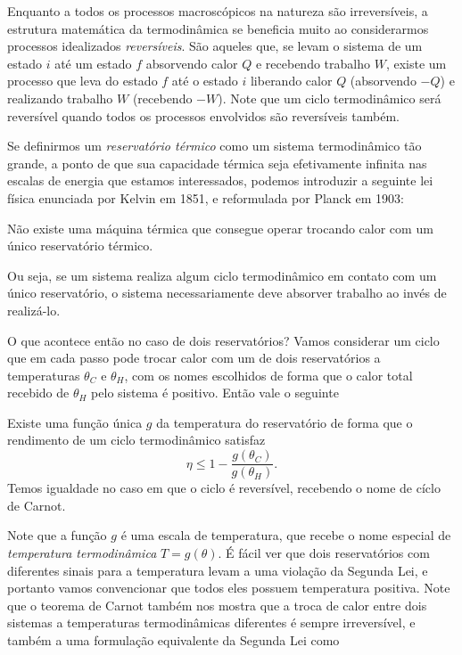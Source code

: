 Enquanto a todos os processos macroscópicos na natureza são irreversíveis, a
estrutura matemática da termodinâmica se beneficia muito ao considerarmos
processos idealizados \emph{reversíveis}. São aqueles que, se levam o sistema de
um estado $i$ até um estado $f$ absorvendo calor $Q$ e recebendo trabalho $W$,
existe um processo que leva do estado $f$ até o estado $i$ liberando calor $Q$
(absorvendo $-Q$) e realizando trabalho $W$ (recebendo $-W$). Note que um ciclo
termodinâmico será reversível quando todos os processos envolvidos são
reversíveis também.

Se definirmos um \emph{reservatório térmico} como um sistema termodinâmico tão
grande, a ponto de que sua capacidade térmica seja efetivamente infinita nas
escalas de energia que estamos interessados, podemos introduzir a seguinte lei
física enunciada por Kelvin em 1851, e reformulada por Planck em 1903:
\begin{law}
    Não existe uma máquina térmica que consegue operar trocando calor com um
    único reservatório térmico.
\end{law}
Ou seja, se um sistema realiza algum ciclo termodinâmico em contato com um
único reservatório, o sistema necessariamente deve absorver trabalho ao invés de
realizá-lo.

O que acontece então no caso de dois reservatórios? Vamos considerar um ciclo
que em cada passo pode trocar calor com um de dois reservatórios a temperaturas
$\theta_C$ e $\theta_H$, com os nomes escolhidos de forma que o calor total
recebido de $\theta_H$ pelo sistema é positivo. Então vale o seguinte

\begin{theorem}[Carnot]
    Existe uma função única $g$ da temperatura do reservatório de forma que o
    rendimento de um ciclo termodinâmico satisfaz
    $$\eta\leq1-\frac{g(\theta_C)}{g(\theta_H)}.$$
    Temos igualdade no caso em que o ciclo é reversível, recebendo o nome de
    cíclo de Carnot.
\end{theorem}
Note que a função $g$ é uma escala de temperatura, que recebe o nome especial de
\emph{temperatura termodinâmica} $T=g(\theta)$. É fácil ver que dois
reservatórios com diferentes sinais para a temperatura levam a uma violação da
Segunda Lei, e portanto vamos convencionar que todos eles possuem temperatura
positiva. Note que o teorema de Carnot também nos mostra que a troca de calor
entre dois sistemas a temperaturas termodinâmicas diferentes é sempre
irreversível, e também a uma formulação equivalente da Segunda Lei como

